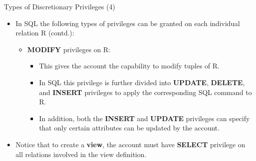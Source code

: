 
\begin{frame}{Types of Discretionary Privileges (4)}
    \Large %
    
    \begin{itemize}
        \vspace{-0.5cm} %
        
        \item In SQL the following types of privileges can be granted on each individual relation R (contd.):
        
        \begin{itemize}
            \large %
            \setlength{\itemsep}{0.2cm}
            
            \item \textbf{MODIFY} privileges on R:
            
            \begin{itemize}
                \normalsize %
                \setlength{\itemsep}{0.1cm}
                
                \item This gives the account the capability to modify tuples of R.
                
                \item In SQL this privilege is further divided into \textbf{UPDATE}, \textbf{DELETE}, and \textbf{INSERT} privileges to apply the corresponding SQL command to R.
                
                \item In addition, both the \textbf{INSERT} and \textbf{UPDATE} privileges can specify that only certain attributes can be updated by the account.
            \end{itemize}
            
        \end{itemize}
        
        \vspace{0.4cm} %
        
        \item Notice that to create a \textbf{view}, the account must have \textbf{SELECT} privilege on all relations involved in the view definition.
        
    \end{itemize}
\end{frame}

